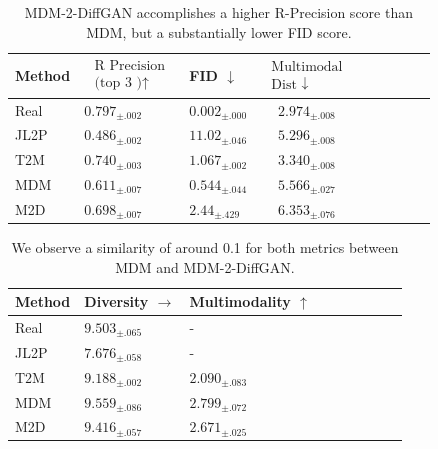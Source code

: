 \documentclass[10pt,twocolumn,letterpaper]{article}
\begin{document}
\begin{table}[H]
    \centering
    \begin{tabular}{|p{1.4cm}|p{1.8cm}|p{1.5cm}|c|c|c|c|c|c|}
    \hline Method & $\begin{array}{l}\text { R Precision } \\
    \text { (top } 3 \text { )↑ }\end{array}$ & FID $\downarrow$ & $\begin{array}{c}\text { Multimodal } \\
    \text { Dist } \downarrow\end{array}$ \\
    \hline Real & $0.797_{ \pm .002}$ & $0.002_{ \pm .000}$ & $2.974_{ \pm .008}$ \\
    \hline JL2P & $0.486_{ \pm .002}$ & $11.02_{ \pm .046}$ & $5.296_{ \pm .008}$ \\
    \hline $\mathrm{T} 2 \mathrm{M}$ & $0.740_{ \pm .003}$ & $1.067_{ \pm .002}$ & $3.340_{ \pm .008}$ \\
    \hline MDM & $0.611_{ \pm .007}$ & $0.544_{ \pm .044}$ & $5.566_{ \pm .027}$ \\
    \hline M2D & $0.698_{ \pm .007}$ & $2.44_{ \pm .429}$ & $6.353_{ \pm .076}$ \\
    \hline
    \end{tabular}
    \caption{MDM-2-DiffGAN accomplishes a higher R-Precision score than MDM, but a substantially lower FID score.}
    \label{tab:metrics}
\end{table}
\begin{table}[H]
    \begin{tabular}{|p{2cm}|p{2cm}|p{2cm}|c|c|c|c|c|c|}
        \hline Method & Diversity $\rightarrow$ & Multimodality $\uparrow$ \\
        \hline Real & $9.503_{ \pm .065}$ & - \\
        \hline JL2P & $7.676_{ \pm .058}$ & - \\
        \hline $\mathrm{T} 2 \mathrm{M}$ & $9.188_{ \pm .002}$ & $2.090_{ \pm .083}$ \\
        \hline MDM & $9.559_{ \pm .086}$ & $2.799_{ \pm .072}$ \\
        \hline M2D & $9.416_{ \pm .057}$ & $2.671_{ \pm .025}$ \\
        \hline
        \end{tabular}
    \caption{We observe a similarity of around 0.1 for both metrics between MDM and MDM-2-DiffGAN.}
    \label{tab:metrics2}
\end{table}
\end{document}
